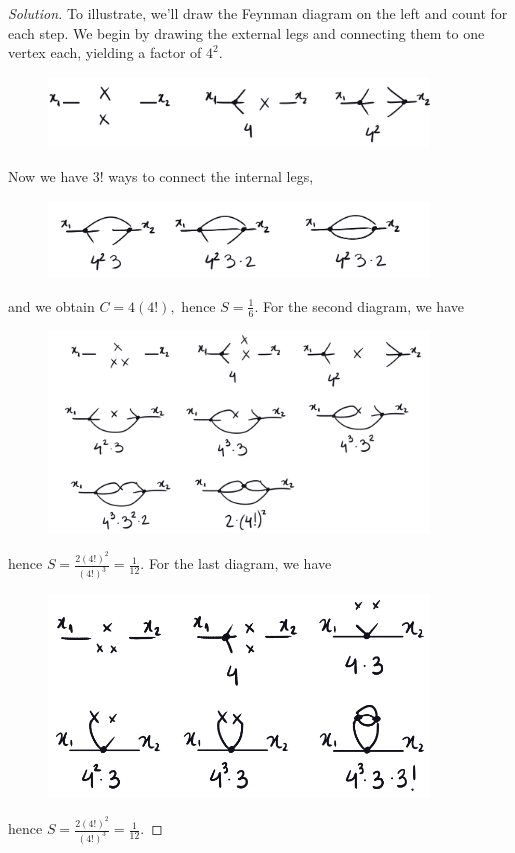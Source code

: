 \begin{proof}[Solution]
   To illustrate, we'll draw the Feynman diagram on the left and count for each step. We begin by drawing the external legs and connecting them to one vertex each, yielding a factor of \(4^2\).
   \begin{figure}[H]
      \centering
      \includegraphics[width=0.9\textwidth]{p2ai.png}
   \end{figure}
   \noindent Now we have \(3!\) ways to connect the internal legs,
   \begin{figure}[H]
      \centering
      \includegraphics[width=0.9\textwidth]{p2ai2.png}
   \end{figure}
   \noindent and we obtain \(C = 4 (4!),\)  hence \(S = \frac16.\) For the second diagram, we have 
   \begin{figure}[H]
      \centering
      \includegraphics[width=0.9\textwidth]{p2aii.png}
   \end{figure}
   \noindent hence \(S = \frac{2(4!)^2}{(4!)^3} = \frac1{12}.\) For the last diagram, we have
   \begin{figure}[H]
      \centering
      \includegraphics[width=0.9\textwidth]{p2aiii.png}
   \end{figure}
   \noindent hence \(S = \frac{2(4!)^2}{(4!)^3} = \frac{1}{12}.\)


\end{proof}
